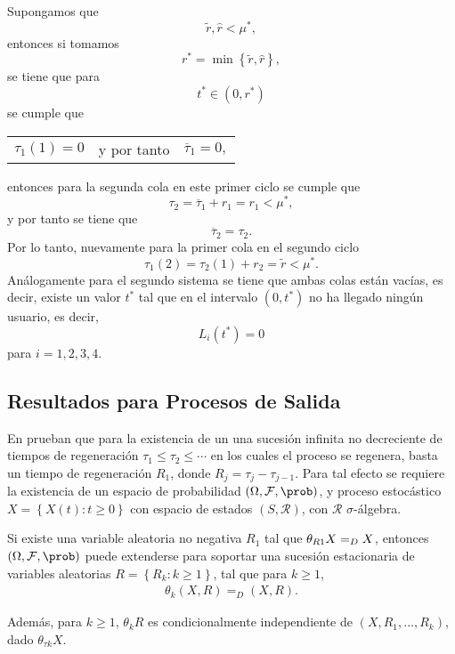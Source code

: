 Supongamos que $$\tilde{r},\hat{r}<\mu^{*},$$ entonces si tomamos $$r^{*}=\min\left\{\tilde{r},\hat{r}\right\},$$ se tiene que para  $$t^{*}\in\left(0,r^{*}\right)$$ se cumple que 
\begin{center}
\begin{tabular}{lcl}
$\tau_{1}\left(1\right)=0$ & y por tanto & $\overline{\tau}_{1}=0,$
\end{tabular}
\end{center}
entonces para la segunda cola en este primer ciclo se cumple que $$\tau_{2}=\overline{\tau}_{1}+r_{1}=r_{1}<\mu^{*},$$ y por tanto se tiene que  $$\overline{\tau}_{2}=\tau_{2}.$$ Por lo tanto, nuevamente para la primer cola en el segundo ciclo $$\tau_{1}\left(2\right)=\tau_{2}\left(1\right)+r_{2}=\tilde{r}<\mu^{*}.$$ An\'alogamente para el segundo sistema se tiene que ambas colas est\'an vac\'ias, es decir, existe un valor $t^{*}$ tal que en el intervalo $\left(0,t^{*}\right)$ no ha llegado ning\'un usuario, es decir, $$L_{i}\left(t^{*}\right)=0$$ para $i=1,2,3,4$.

\subsection{Resultados para Procesos de Salida}

En \cite{Sigman2} prueban que para la existencia de un una sucesi\'on infinita no decreciente de tiempos de regeneraci\'on $\tau_{1}\leq\tau_{2}\leq\cdots$ en los cuales el proceso se regenera, basta un tiempo de regeneraci\'on $R_{1}$, donde $R_{j}=\tau_{j}-\tau_{j-1}$. Para tal efecto se requiere la existencia de un espacio de probabilidad $\left(\Omega,\mathcal{F},\prob\right)$, y proceso estoc\'astico $\textit{X}=\left\{X\left(t\right):t\geq0\right\}$ con espacio de estados $\left(S,\mathcal{R}\right)$, con $\mathcal{R}$ $\sigma$-\'algebra.

\begin{Prop}
Si existe una variable aleatoria no negativa $R_{1}$ tal que $\theta_{R\footnotesize{1}}X=_{D}X$, entonces $\left(\Omega,\mathcal{F},\prob\right)$ puede extenderse para soportar una sucesi\'on estacionaria de variables aleatorias $R=\left\{R_{k}:k\geq1\right\}$, tal que para $k\geq1$,
\begin{eqnarray*}
\theta_{k}\left(X,R\right)=_{D}\left(X,R\right).
\end{eqnarray*}

Adem\'as, para $k\geq1$, $\theta_{k}R$ es condicionalmente independiente de $\left(X,R_{1},\ldots,R_{k}\right)$, dado $\theta_{\tau k}X$.

\end{Prop}


